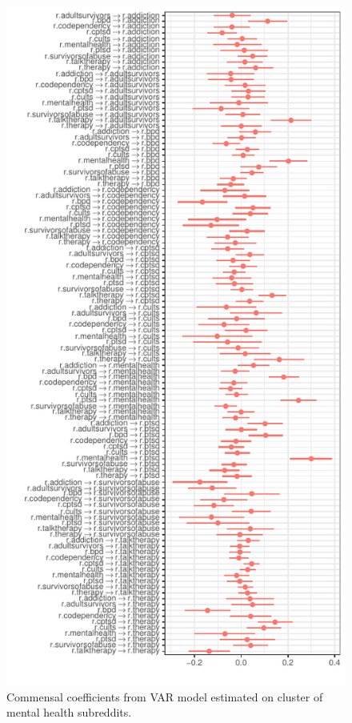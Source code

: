 \documentclass[manuscript]{acmart}\usepackage[]{graphicx}\usepackage[]{color}
\makeatletter
\def\maxwidth{ %
  \ifdim\Gin@nat@width>\linewidth
    \linewidth
  \else
    \Gin@nat@width
  \fi
}
\makeatother
\begin{document}
\begin{figure}[h]
\centering

\includegraphics[width=\maxwidth]{figures/knitr-mut_coefs-1} 

\caption{Commensal coefficients from VAR model estimated on cluster of mental health subreddits. \label{mut.coefs}}
\end{figure}
\end{document}
